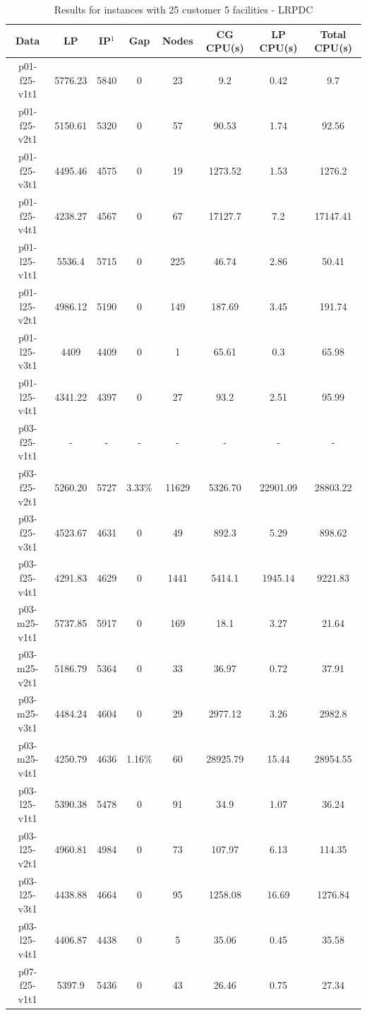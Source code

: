 \begin{table}[h!tbp]
\centering
\caption{Results for instances with 25 customer 5 facilities - LRPDC}\label{25Cust_lrpdc}
\begin {tabular}[t]{|c|c|c|c|c|c|c|c|}  
\hline
{\bf Data} & {\bf LP} & {\bf IP$^1$} & {\bf Gap} & {\bf Nodes} & {\bf CG CPU(s) } & {\bf LP CPU(s)} & {\bf Total CPU(s)}\\\hline%
p01-f25-v1t1	&	5776.23	&	5840	&	0	&	23	&	9.2	&	0.42	&	9.7	\\
p01-f25-v2t1	&	5150.61	&	5320	&	0	&	57	&	90.53	&	1.74	&	92.56	\\
p01-f25-v3t1	&	4495.46	&	4575	&	0	&	19	&	1273.52	&	1.53	&	1276.2	\\
p01-f25-v4t1	&	4238.27	&	4567	&	0	&	67	&	17127.7	&	7.2	&	17147.41	\\
p01-l25-v1t1	&	5536.4	&	5715	&	0	&	225	&	46.74	&	2.86	&	50.41	\\
p01-l25-v2t1	&	4986.12	&	5190	&	0	&	149	&	187.69	&	3.45	&	191.74	\\
p01-l25-v3t1	&	4409	&	4409	&	0	&	1	&	65.61	&	0.3	&	65.98	\\
p01-l25-v4t1	&	4341.22	&	4397	&	0	&	27	&	93.2	&	2.51	&	95.99	\\
p03-f25-v1t1	&	-	&	-	&	-	&	-	&	-	&	-	&	-	\\
p03-f25-v2t1	&	5260.20	&	5727	&      3.33\%	&	11629	&	5326.70	&	22901.09 &	28803.22 \\
p03-f25-v3t1	&	4523.67	&	4631	&	0	&	49	&	892.3	&	5.29	&	898.62	\\
p03-f25-v4t1	&	4291.83	&	4629	&	0	&	1441	&	5414.1	&	1945.14	&	9221.83	\\
p03-m25-v1t1	&	5737.85	&	5917	&	0	&	169	&	18.1	&	3.27	&	21.64	\\
p03-m25-v2t1	&	5186.79	&	5364	&	0	&	33	&	36.97	&	0.72	&	37.91	\\
p03-m25-v3t1	&	4484.24	&	4604	&	0	&	29	&	2977.12	&	3.26	&	2982.8	\\
p03-m25-v4t1	&	4250.79	&	4636	&	1.16\%	&	60	&	28925.79	&	15.44	&	28954.55	\\
p03-l25-v1t1	&	5390.38	&	5478	&	0	&	91	&	34.9	&	1.07	&	36.24	\\
p03-l25-v2t1	&	4960.81	&	4984	&	0	&	73	&	107.97	&	6.13	&	114.35	\\
p03-l25-v3t1	&	4438.88	&	4664	&	0	&	95	&	1258.08	&	16.69	&	1276.84	\\
p03-l25-v4t1	&	4406.87	&	4438	&	0	&	5	&	35.06	&	0.45	&	35.58	\\
p07-f25-v1t1	&	5397.9	&	5436	&	0	&	43	&	26.46	&	0.75	&	27.34	\\

\end{tabular}
\end{table}
